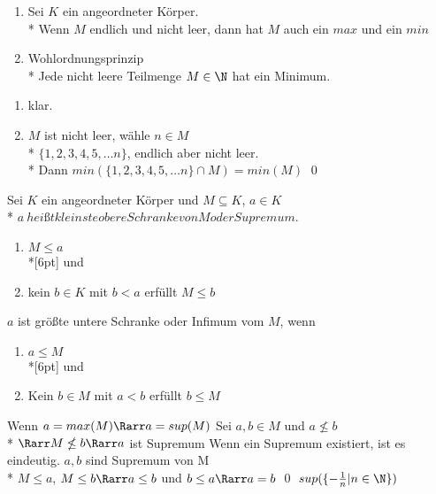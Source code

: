 	\begin{enumerate}
	\item{Sei $K$ ein angeordneter Körper.\\*
	Wenn $M$ endlich und nicht leer, dann hat $M$ auch ein $max$ und ein $min$}
	\item{Wohlordnungsprinzip\\*
	Jede nicht leere Teilmenge $M \in \N$ hat ein Minimum.}
	\end{enumerate}
\bew
	\begin{enumerate}
	\item{klar.}
	\item{$M$ ist nicht leer, wähle $n \in M$\\*
	$\{1, 2, 3, 4, 5, … n\}$, endlich aber nicht leer.\\*
	Dann $min(\{1, 2, 3, 4, 5, … n\} \cap M) = min(M)$ \qed}
	\end{enumerate}

	Sei $K$ ein angeordneter Körper und $M \subseteq K$, $a \in K$\\*
	$a \ heißt kleinste obere Schranke von M oder Supremum.$
	\begin{enumerate}
	\item{$M \leq a$}\\*[6pt]
	und
	\item{kein $b \in K$ mit $b < a$ erfüllt $M \leq b$}
	\end{enumerate}
	$a$ ist größte untere Schranke oder Infimum vom $M$, wenn
	\begin{enumerate}
	\item{$a \leq M$}\\*[6pt]
	und
	\item{Kein $b \in M$ mit $a < b$ erfüllt $b \leq M$}
	\end{enumerate}
\bem
	Wenn $a = max(M) \Rarr a = sup(M)$ 
\bew
	Sei $a, b \in M$ und $a \nleq b$\\*
	$\Rarr M \nleq b \Rarr a$ ist Supremum
\bem
	Wenn ein Supremum existiert, ist es eindeutig.
\bew
	$a, b$ sind Supremum von M\\*
	$M \leq a$, $M \leq b \Rarr a \leq b $ und $b \leq a \Rarr a = b$ \qed
\bsp
	$sup(\{ -\frac{1}{n} | n \in \N \})$